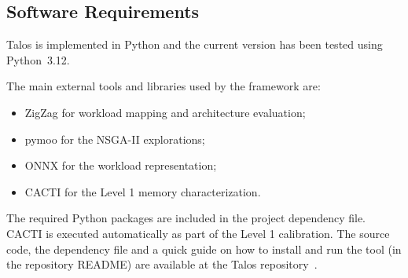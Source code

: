 \subsection{Software Requirements}

Talos is implemented in Python and the current version has been tested
using Python~3.12.

The main external tools and libraries used by the framework are:

\begin{itemize}
    \item ZigZag for workload mapping and architecture evaluation;
    \item pymoo for the NSGA-II explorations;
    \item ONNX for the workload representation;
    \item CACTI for the Level 1 memory characterization.
\end{itemize}

The required Python packages are included in the project dependency
file. CACTI is executed automatically as part of the Level 1
calibration. The source code, the dependency file and a quick guide on
how to install and run the tool (in the repository README) are
available at the Talos repository~\cite{talos_repo}.

